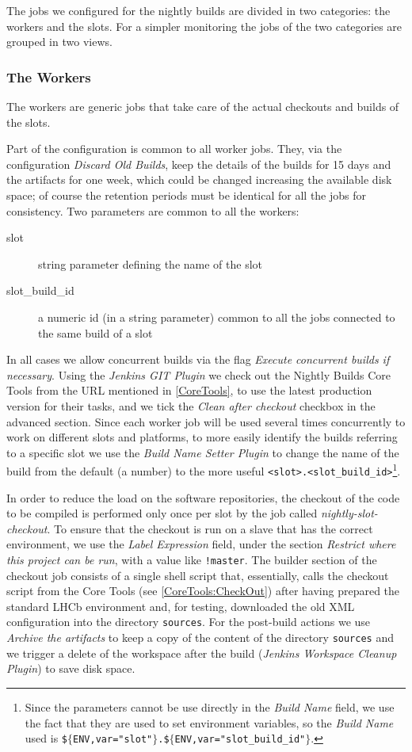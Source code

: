\documentclass{lhcbnote}
\begin{document}
The jobs we configured for the nightly builds are divided in two categories: the
workers and the slots.  For a simpler monitoring the jobs of the two categories
are grouped in two views.

\subsubsection{The Workers}
\label{Jenkins:Workers}
The workers are generic jobs that take care of the actual checkouts and builds
of the slots.

Part of the configuration is common to all worker jobs.  They, via the
configuration \emph{Discard Old Builds}, keep the details of the builds for 15
days and the artifacts for one week, which could be changed increasing the
available disk space; of course the retention periods must be identical for all
the jobs for consistency.  Two parameters are common to all the workers:
\begin{description}
  \item[slot] string parameter defining the name of the slot
  \item[slot\_build\_id] a numeric id (in a string parameter) common to all the
jobs connected to the same build of a slot
\end{description}
In all cases we allow concurrent builds via the flag \emph{Execute concurrent
builds if necessary}.  Using the \emph{Jenkins GIT Plugin} we check out the
Nightly Builds Core Tools from the URL mentioned in \ref{CoreTools}, to use the
latest production version for their tasks, and we tick the \emph{Clean after
checkout} checkbox in the advanced section.  Since each worker job will be used
several times concurrently to work on different slots and platforms, to more
easily identify the builds referring to a specific slot we use the \emph{Build
Name Setter Plugin} to change the name of the build from the default (a number)
to the more useful \verb|<slot>.<slot_build_id>|\footnote{Since the parameters
cannot be use directly in the \emph{Build Name} field, we use the fact that they
are used to set environment variables, so the \emph{Build Name} used is
\texttt{\$$\{$ENV,var="slot"$\}$.\$$\{$ENV,var="slot\_build\_id"$\}$}.}.

In order to reduce the load on the software repositories, the checkout of the
code to be compiled is performed only once per slot by the job called
\emph{nightly-slot-checkout}.  To ensure that the checkout is run on a slave
that has the correct environment, we use the \emph{Label Expression} field,
under the section \emph{Restrict where this project can be run}, with a value
like \verb|!master|.  The builder section of the checkout job consists of a
single shell script that, essentially, calls the checkout script from the Core
Tools (see \ref{CoreTools:CheckOut}) after having prepared the standard LHCb
environment and, for testing, downloaded the old XML configuration into the
directory \texttt{sources}.  For the post-build actions we use \emph{Archive the
artifacts} to keep a copy of the content of the directory \texttt{sources} and
we trigger a delete of the workspace after the build (\emph{Jenkins Workspace
Cleanup Plugin}) to save disk space.
\end{document}
